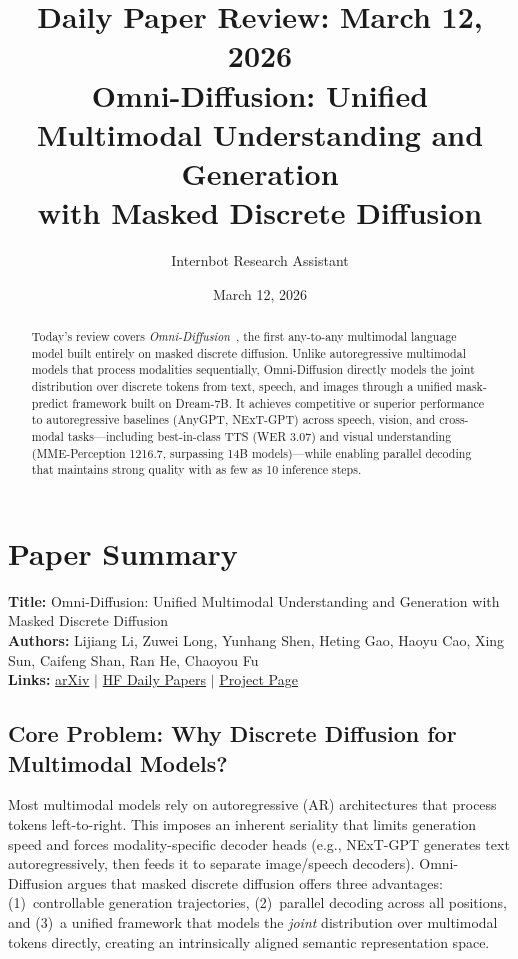 \documentclass[11pt]{article}
\title{Daily Paper Review: March 12, 2026\\Omni-Diffusion: Unified Multimodal Understanding and Generation\\with Masked Discrete Diffusion}
\author{Internbot Research Assistant}
\date{March 12, 2026}
\begin{document}
\maketitle

\begin{abstract}
Today's review covers \emph{Omni-Diffusion}~\citep{li2026omnidiffusion}, the first any-to-any multimodal language model built entirely on masked discrete diffusion. Unlike autoregressive multimodal models that process modalities sequentially, Omni-Diffusion directly models the joint distribution over discrete tokens from text, speech, and images through a unified mask-predict framework built on Dream-7B. It achieves competitive or superior performance to autoregressive baselines (AnyGPT, NExT-GPT) across speech, vision, and cross-modal tasks---including best-in-class TTS (WER 3.07) and visual understanding (MME-Perception 1216.7, surpassing 14B models)---while enabling parallel decoding that maintains strong quality with as few as 10 inference steps.
\end{abstract}

\section{Paper Summary}

\textbf{Title:} Omni-Diffusion: Unified Multimodal Understanding and Generation with Masked Discrete Diffusion\\
\textbf{Authors:} Lijiang Li, Zuwei Long, Yunhang Shen, Heting Gao, Haoyu Cao, Xing Sun, Caifeng Shan, Ran He, Chaoyou Fu\\
\textbf{Links:}
\href{https://arxiv.org/abs/2603.06577}{arXiv} $\mid$
\href{https://huggingface.co/papers/2603.06577}{HF Daily Papers} $\mid$
\href{https://omni-diffusion.github.io}{Project Page}

\subsection{Core Problem: Why Discrete Diffusion for Multimodal Models?}

Most multimodal models rely on autoregressive (AR) architectures that process tokens left-to-right. This imposes an inherent seriality that limits generation speed and forces modality-specific decoder heads (e.g., NExT-GPT generates text autoregressively, then feeds it to separate image/speech decoders). Omni-Diffusion argues that masked discrete diffusion offers three advantages: (1)~controllable generation trajectories, (2)~parallel decoding across all positions, and (3)~a unified framework that models the \emph{joint} distribution over multimodal tokens directly, creating an intrinsically aligned semantic representation space.
\end{document}
